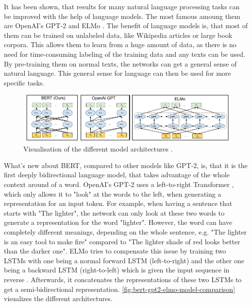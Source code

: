 It has been shown, that results for many natural language processing tasks can be improved with the help of language models.
The most famous amoung them are OpenAI's GPT-2 \cite{radford2019language} and ELMo \cite{1802.05365}.
The benefit of language models is, that most of them can be trained on unlabeled data, like Wikipedia articles or large book corpora.
This allows them to learn from a huge amount of data, as there is no need for time-consuming labeling of the training data and any texts can be used.
By pre-training them on normal texts, the networks can get a general sense of natural language.
This general sense for language can then be used for more specific tasks.

\begin{figure}[h]
\centering
\includegraphics[width=0.7\paperwidth]{figures/bert-gpt2-elmo-model-comparison}
\caption[Visualisation of the different model architectures]{Visualisation of the different model architectures \cite[p.~13]{devlin2018bert}.}
\label{fig:bert-gpt2-elmo-model-comparison}
\end{figure}

What's new about BERT, compared to other models like GPT-2, is, that it is the first deeply bidirectional language model, that takes advantage of the whole context around of a word.
OpenAI's GPT-2 uses a left-to-right Transformer \cite[p.~4]{radford2019language}, which only allows it to "look" at the words to the left, when generating a representation for an input token.
For example, when having a sentence that starts with "The lighter", the network can only look at these two words to generate a representation for the word "lighter".
However, the word can have completely different meanings, depending on the whole sentence, e.g. "The lighter is an easy tool to make fire" compared to "The lighter shade of red looks better than the darker one". 
ELMo tries to compensate this issue by training two LSTMs with one being a normal forward LSTM (left-to-right) and the other one being a backward LSTM (right-to-left) which is given the input sequence in reverse \cite[p.~2--3]{1802.05365}.
Afterwards, it concatenates the representations of these two LSTMs to get a semi-bidirectional representation.
\autoref{fig:bert-gpt2-elmo-model-comparison} visualizes the different architectures.

